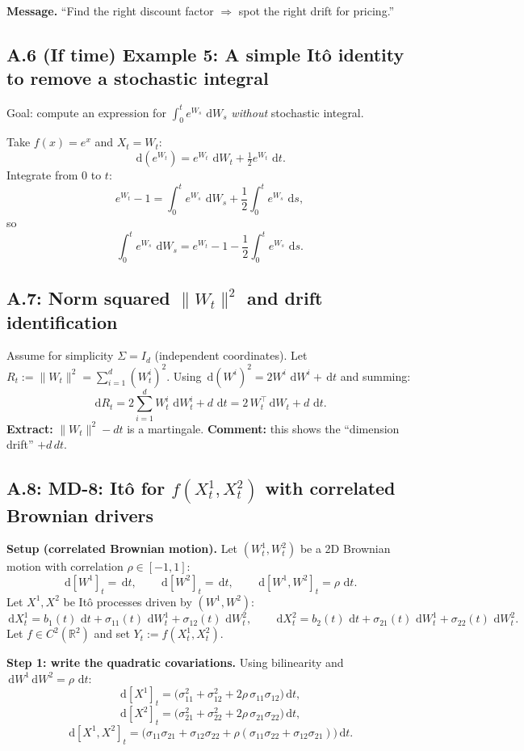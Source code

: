 \documentclass[11pt]{article}
\theoremstyle{definition}
\theoremstyle{remark}
\newcommand{\R}{\mathbb{R}}
\newcommand{\1}{\mathbf{1}}
\newcommand{\dd}{\,\mathrm{d}}
\theoremstyle{definition}
\begin{document}
\textbf{Message.} ``Find the right discount factor $\Rightarrow$ spot the right drift for pricing.''


\subsection*{A.6 (If time) Example 5: A simple It\^o identity to remove a stochastic integral}
Goal: compute an expression for $\int_0^t e^{W_s}\,\dd W_s$ \emph{without} stochastic integral.

Take $f(x)=e^x$ and $X_t=W_t$:
\[
\dd(e^{W_t}) = e^{W_t}\,\dd W_t + \tfrac12 e^{W_t}\,\dd t.
\]
Integrate from $0$ to $t$:
\[
e^{W_t}-1 = \int_0^t e^{W_s}\,\dd W_s + \frac12\int_0^t e^{W_s}\,\dd s,
\]
so
\[
\boxed{
\int_0^t e^{W_s}\,\dd W_s
=
e^{W_t}-1-\frac12\int_0^t e^{W_s}\,\dd s.}
\]

\subsection*{A.7: Norm squared $\|W_t\|^2$ and drift identification}
Assume for simplicity $\Sigma=I_d$ (independent coordinates).
Let $R_t:=\|W_t\|^2=\sum_{i=1}^d (W_t^i)^2$.
Using $\dd (W^i)^2 = 2W^i\,\dd W^i + \dd t$ and summing:
\[
\dd R_t = 2\sum_{i=1}^d W_t^i\,\dd W_t^i + d\,\dd t
= 2\,W_t^\top \dd W_t + d\,\dd t.
\]
\textbf{Extract:} $\|W_t\|^2-dt$ is a martingale.
\textbf{Comment:} this shows the ``dimension drift'' $+d\,dt$.

\subsection*{A.8: MD-8: It\^o for $f(X^1_t,X^2_t)$ with correlated Brownian drivers}


\textbf{Setup (correlated Brownian motion).}
Let $(W_t^1,W_t^2)$ be a 2D Brownian motion with correlation $\rho\in[-1,1]$:
\[
\dd[W^1]_t=\dd t,\qquad \dd[W^2]_t=\dd t,\qquad \dd[W^1,W^2]_t=\rho\,\dd t.
\]
Let $X^1,X^2$ be It\^o processes driven by $(W^1,W^2)$:
\[
\dd X_t^1 = b_1(t)\,\dd t + \sigma_{11}(t)\,\dd W_t^1 + \sigma_{12}(t)\,\dd W_t^2,
\qquad
\dd X_t^2 = b_2(t)\,\dd t + \sigma_{21}(t)\,\dd W_t^1 + \sigma_{22}(t)\,\dd W_t^2.
\]
Let $f\in C^2(\R^2)$ and set $Y_t:=f(X_t^1,X_t^2)$.

\medskip
\textbf{Step 1: write the quadratic covariations.}
Using bilinearity and $\dd W^1\dd W^2=\rho\,\dd t$:
\[
\dd[X^1]_t
=
\Big(\sigma_{11}^2 + \sigma_{12}^2 + 2\rho\,\sigma_{11}\sigma_{12}\Big)\dd t,
\]
\[
\dd[X^2]_t
=
\Big(\sigma_{21}^2 + \sigma_{22}^2 + 2\rho\,\sigma_{21}\sigma_{22}\Big)\dd t,
\]
\[
\dd[X^1,X^2]_t
=
\Big(\sigma_{11}\sigma_{21}+\sigma_{12}\sigma_{22}
+\rho(\sigma_{11}\sigma_{22}+\sigma_{12}\sigma_{21})\Big)\dd t.
\]
\end{document}

